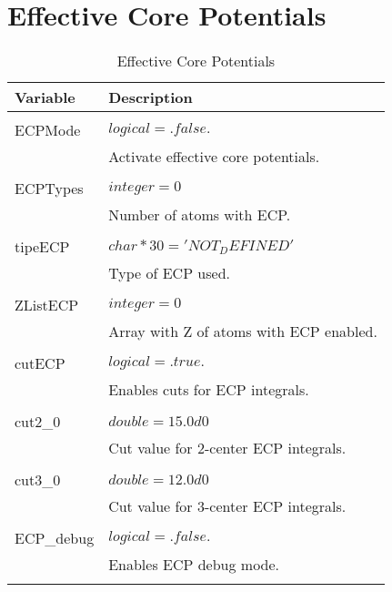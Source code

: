 \section{Effective Core Potentials}
\begin{Spacing}{1.0}
   \begin{longtable}{ p{} p{} }
   
      \toprule
      \textbf{Variable} & Description \\*
      \midrule \\*
      \endhead
   
      \bottomrule
      \caption{Effective Core Potentials}
      \endfoot
   
      ECPMode & $ logical = .false. $ \\
      & Activate effective core potentials.\\
      \\
   
      ECPTypes & $ integer = 0 $ \\
      & Number of atoms with ECP.\\
      \\
   
      tipeECP & $ char*30 = 'NOT_DEFINED' $ \\
      & Type of ECP used.\\
      \\
   
      ZListECP & $ integer = 0 $ \\
      & Array with Z of atoms with ECP enabled.\\
      \\
   
      cutECP & $ logical = .true. $ \\
      & Enables cuts for ECP integrals.\\
      \\
   
      cut2\_0 & $ double = 15.0d0 $ \\
      & Cut value for 2-center ECP integrals.\\
      \\
   
      cut3\_0 & $ double = 12.0d0 $ \\
      & Cut value for 3-center ECP integrals.\\
      \\
   
      ECP\_debug & $ logical = .false. $ \\
      & Enables ECP debug mode.\\
      \\
   

\end{longtable}
\end{Spacing}
